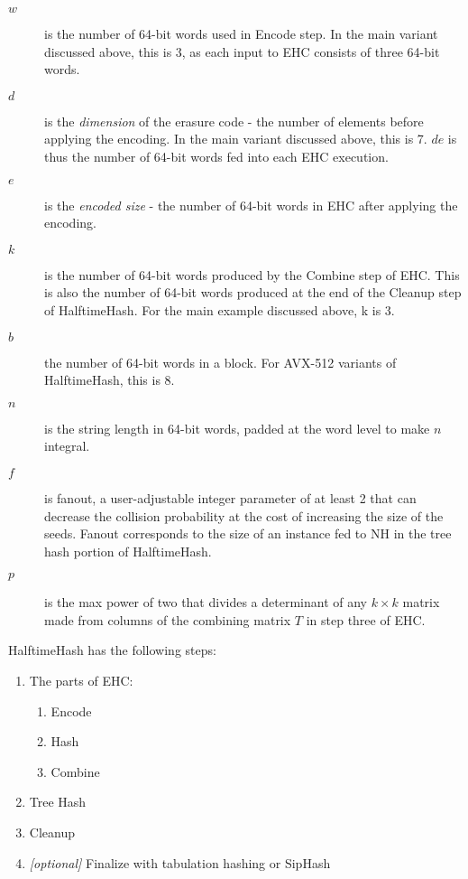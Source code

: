 \documentclass[sigconf, nonacm]{acmart}
\begin{document}
\begin {description}
\item[$w$] is the number of 64-bit words used in Encode step.
  In the main variant discussed above, this is 3, as each input to EHC consists of three 64-bit words.
\item[$d$] is the {\em dimension} of the erasure code - the number of elements before applying the encoding.
  In the main variant discussed above, this is 7.
  $de$ is thus the number of 64-bit words fed into each EHC execution.
\item[$e$] is the {\em encoded size} - the number of 64-bit words in EHC after applying the encoding.
\item[$k$] is the number of 64-bit words produced by the Combine step of EHC.
  This is also the number of 64-bit words produced at the end of the Cleanup step of HalftimeHash.
  For the main example discussed above, k is 3.
\item[$b$] the number of 64-bit words in a block.
  For AVX-512 variants of HalftimeHash, this is 8.
\item[$n$] is the string length in 64-bit words, padded at the word level to make $n$ integral.
\item[$f$] is fanout, a user-adjustable integer parameter of at least 2 that can decrease the collision probability at the cost of increasing the size of the seeds.
  Fanout corresponds to the size of an instance fed to NH in the tree hash portion of HalftimeHash.
\item[$p$] is the max power of two that divides a determinant of any $k \times k$ matrix made from columns of the combining matrix $T$ in step three of EHC.
\end{description}

HalftimeHash has the following steps:

\begin{enumerate}
\item The parts of EHC:
  \begin {enumerate}
  \item Encode
  \item Hash
  \item Combine
  \end{enumerate}
\item Tree Hash
\item Cleanup
\item{} {\em [optional]} Finalize with tabulation hashing or SipHash
\end{enumerate}
\end{document}
